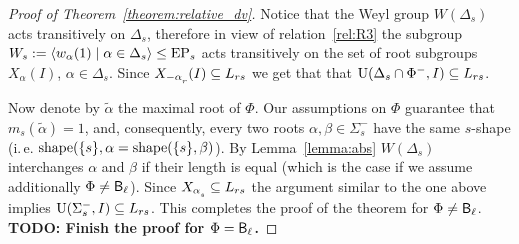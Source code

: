 \begin{proof}[Proof of Theorem~\ref{theorem:relative_dv}]
Notice that the Weyl group $W(\Delta_s)$ acts transitively on $\Delta_s$, therefore in view of relation~\ref{rel:R3} the subgroup
$W_s := \langle w_\alpha(1) \mid \alpha\in\Delta_s\rangle \leq \operatorname{EP}_s$ acts transitively on the set of root subgroups $X_\alpha(I)$, $\alpha\in \Delta_s$.
Since $X_{-\alpha\ssub{r}}(I) \subseteq L_{rs}$ we get that that $\operatorname{U}(\Delta_s \cap \Phi^-, I)\subseteq L_{rs}$.

Now denote by $\widetilde{\alpha}$ the maximal root of $\Phi$. Our assumptions on $\Phi$ guarantee that $m_s(\widetilde{\alpha})=1$, 
and, consequently, every two roots $\alpha, \beta \in \Sigma^-_s$ have the same $s$-shape (i.\,e. $\operatorname{shape}(\{s\}, \alpha = \operatorname{shape}(\{s\}, \beta)$).
By Lemma~\ref{lemma:abs} $W(\Delta_s)$ interchanges $\alpha$ and $\beta$ if their length is equal (which is the case if we assume additionally $\Phi\neq \mathsf{B}_\ell$).
Since $X_{\alpha\ssub{s}} \subseteq L_{rs}$ the argument similar to the one above implies $\operatorname{U}(\Sigma^-_s, I)\subseteq L_{rs}$.
This completes the proof of the theorem for $\Phi\neq \mathsf{B}_\ell$. 
\textbf{TODO: Finish the proof for $\Phi=\mathsf{B}_\ell$.}
\end{proof}
